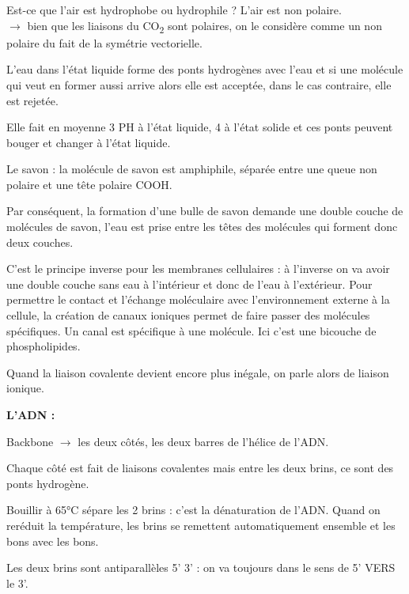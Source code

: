 \documentclass[11pt]{article}
\begin{document}
Est-ce que l'air est hydrophobe ou hydrophile ? L'air est non polaire.\\
$\rightarrow$ bien que les liaisons du CO\textsubscript{2} sont polaires, on le considère comme un non polaire du fait de la symétrie vectorielle.

\vspace{0.3cm}

L'eau dans l'état liquide forme des ponts hydrogènes avec l'eau et si une molécule qui veut en former aussi arrive alors elle est acceptée, dans le cas contraire, elle est rejetée.

Elle fait en moyenne 3 PH à l'état liquide, 4 à l'état solide et ces ponts peuvent bouger et changer à l'état liquide.

\vspace{0.3cm}

Le savon : la molécule de savon est amphiphile, séparée entre une queue non polaire et une tête polaire COOH.

Par conséquent, la formation d'une bulle de savon demande une double couche de molécules de savon, l'eau est prise entre les têtes des molécules qui forment donc deux couches.

C'est le principe inverse pour les membranes cellulaires : à l'inverse on va avoir une double couche sans eau à l'intérieur et donc de l'eau à l'extérieur. Pour permettre le contact et l'échange moléculaire avec l'environnement externe à la cellule, la création de canaux ioniques permet de faire passer des molécules spécifiques. Un canal est spécifique à une molécule. Ici c'est une bicouche de phospholipides.

\vspace{0.3cm}

Quand la liaison covalente devient encore plus inégale, on parle alors de liaison ionique.

\vspace{0.3cm}

\textbf{L'ADN :}

Backbone $\rightarrow$ les deux côtés, les deux barres de l'hélice de l'ADN.

Chaque côté est fait de liaisons covalentes mais entre les deux brins, ce sont des ponts hydrogène.

Bouillir à 65°C sépare les 2 brins : c'est la dénaturation de l'ADN. Quand on reréduit la température, les brins se remettent automatiquement ensemble et les bons avec les bons.

Les deux brins sont antiparallèles 5' 3' : on va toujours dans le sens de 5' VERS le 3'.
\end{document}
